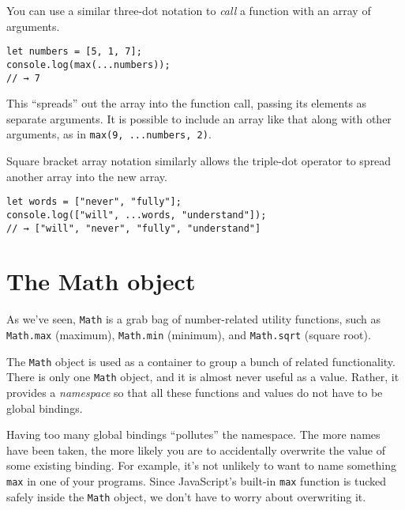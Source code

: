 You can use a similar three-dot notation to \emph{call} a function with an array of arguments.

\begin{lstlisting}
let numbers = [5, 1, 7];
console.log(max(...numbers));
// → 7
\end{lstlisting}
\noindent

This ``spreads'' out the array into the function call, passing its elements as separate arguments. It is possible to include an array like that along with other arguments, as in \lstinline`max(9, ...numbers, 2)`.

Square bracket array notation similarly allows the triple-dot operator to spread another array into the new array.

\begin{lstlisting}
let words = ["never", "fully"];
console.log(["will", ...words, "understand"]);
// → ["will", "never", "fully", "understand"]
\end{lstlisting}
\noindent

\section{The Math object}

As we've seen, \lstinline`Math` is a grab bag of number-related utility functions, such as \lstinline`Math.max` (maximum), \lstinline`Math.min` (minimum), and \lstinline`Math.sqrt` (square root).

\label{data.namespace_pollution}The \lstinline`Math` object is used as a container to group a bunch of related functionality. There is only one \lstinline`Math` object, and it is almost never useful as a value. Rather, it provides a \emph{namespace} so that all these functions and values do not have to be global bindings.

Having too many global bindings ``pollutes'' the namespace. The more names have been taken, the more likely you are to accidentally overwrite the value of some existing binding. For example, it's not unlikely to want to name something \lstinline`max` in one of your programs. Since JavaScript's built-in \lstinline`max` function is tucked safely inside the \lstinline`Math` object, we don't have to worry about overwriting it.

